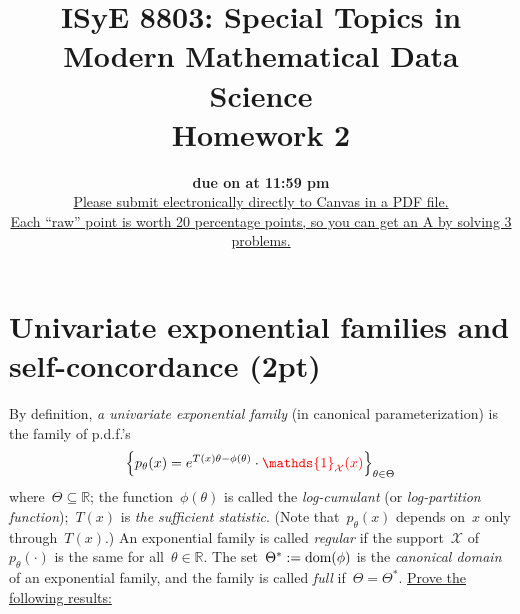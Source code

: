 \documentclass[11pt]{article}
\title{ISyE 8803: Special Topics in Modern Mathematical Data Science\\ 
	   Homework 2}
\date{
\vspace{-0.3cm}
{\bf due on \odima{Sunday, 04/27} at 11:59 pm}\\
\vspace{0.3cm}
\underline{Please submit electronically directly to Canvas in a PDF file.}\\
\underline{Each ``raw'' point is worth 20 percentage points, so you can get an A by solving 3 problems.}
}
\author{}
\newcommand{\proofstep}[1]{$\boldsymbol{{#1}^o}$}
\newcommand{\odima}[1]{{\color{red} #1}}
\newcommand{\R}{\mathds{R}}
\newcommand{\E}{\mathds{E}}
\newcommand{\Cov}{\textup{Cov}}
\newcommand{\cX}{\mathcal{X}}
\newcommand{\bSigma}{\boldsymbol{\Sigma}}
\newcommand{\bId}{\boldsymbol{I}}
\begin{document}
\maketitle
\newcommand{\vsp}{\vspace{0.3cm}}

%


\newpage
\noindent 

\section{Univariate exponential families and self-concordance (2pt)}
By definition, {\em a univariate exponential family} (in canonical parameterization) is the family of p.d.f.'s
\[
\left\{ p_{\theta}(x) = e^{ T(x) \theta - \phi(\theta) } \cdot \odima{\mathds{1}_{\cX}(x)} \right\}_{\theta \in \Theta} 
\]
where~$\Theta \subseteq \R$; the function~$\phi(\theta)$ is called the {\em log-cumulant} (or {\em log-partition function});~$T(x)$ is {\em the sufficient statistic}. 
(Note that~$p_{\theta}(x)$ depends on~$x$ only through~$T(x)$.)
An exponential family is called {\em regular} if the support~$\cX$ of~$p_{\theta}(\cdot)$ is the same for all~$\theta \in \R$. 
The set~$\Theta^* := \textup{dom}(\phi)$ is the {\em canonical domain} of an exponential family, and the family is called {\em full} if~$\Theta = \Theta^*$.
\underline{Prove the following results:}
\end{document}
